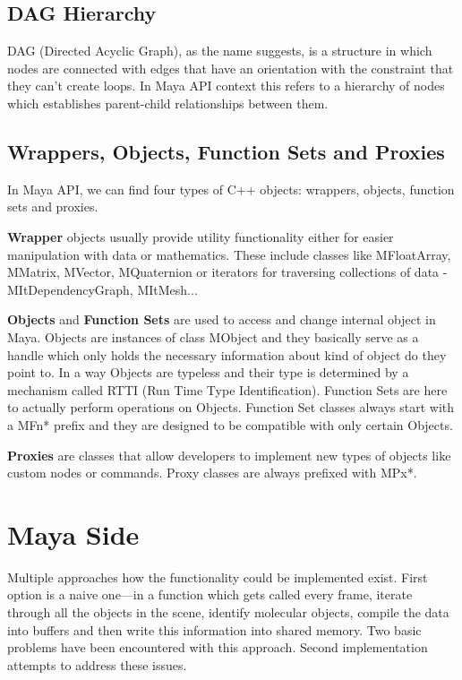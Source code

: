 \documentclass[
  digital, %
  table,   %
  nolof,     %
  nolot,     %
]{fithesis3}
\begin{document}
\subsection{DAG Hierarchy}
DAG (Directed Acyclic Graph), as the name suggests, is a structure in which nodes are connected with edges that have an orientation with the constraint that they can't create loops. In Maya API context this refers to a hierarchy of nodes which establishes parent-child relationships between them.

\subsection{Wrappers, Objects, Function Sets and Proxies}
In Maya API, we can find four types of C++ objects: wrappers, objects, function sets and proxies.

\textbf{Wrapper} objects usually provide utility functionality either for easier manipulation with data or mathematics. These include classes like MFloatArray, MMatrix, MVector, MQuaternion or iterators for traversing collections of data - MItDependencyGraph, MItMesh...

\textbf{Objects} and \textbf{Function Sets} are used to access and change internal object in Maya. Objects are instances of class MObject and they basically serve as a handle which only holds the necessary information about kind of object do they point to. In a way Objects are typeless and their type is determined by a mechanism called RTTI (Run Time Type Identification). Function Sets are here to actually perform operations on Objects. Function Set classes always start with a MFn* prefix and they are designed to be compatible with only certain Objects.

\textbf{Proxies} are classes that allow developers to implement new types of objects like custom nodes or commands. Proxy classes are always prefixed with MPx*.

\section{Maya Side}
Multiple approaches how the functionality could be implemented exist. First option is a naive one—in a function which gets called every frame, iterate through all the objects in the scene, identify molecular objects, compile the data into buffers and then write this information into shared memory. Two basic problems have been encountered with this approach. Second implementation attempts to address these issues.
\end{document}
